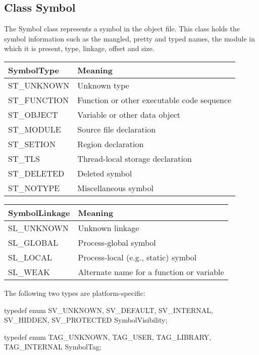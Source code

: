 \subsection{Class Symbol}

The Symbol class represents a symbol in the object file. This class holds the symbol information such as the mangled, pretty and typed names, the module in which it is present, type, linkage, offset and size.


\begin{center}
\begin{tabular}{ll}
\toprule
SymbolType & Meaning \\
\midrule
ST\_UNKNOWN & Unknown type \\
ST\_FUNCTION & Function or other executable code sequence \\
ST\_OBJECT & Variable or other data object \\
ST\_MODULE & Source file declaration \\
ST\_SETION & Region declaration \\
ST\_TLS & Thread-local storage declaration \\
ST\_DELETED & Deleted symbol \\
ST\_NOTYPE & Miscellaneous symbol \\
\bottomrule
\end{tabular}
\end{center}


\begin{center}
\begin{tabular}{ll}
\toprule
SymbolLinkage & Meaning \\
\midrule
SL\_UNKNOWN & Unknown linkage \\
SL\_GLOBAL & Process-global symbol \\
SL\_LOCAL & Process-local (e.g., static) symbol \\
SL\_WEAK & Alternate name for a function or variable \\
\bottomrule
\end{tabular}
\end{center}

The following two types are platform-specific:

\begin{apient}
typedef enum {
    SV_UNKNOWN,
    SV_DEFAULT,
    SV_INTERNAL,
    SV_HIDDEN,
    SV_PROTECTED
} SymbolVisibility;
\end{apient}

\begin{apient}
typedef enum {
    TAG_UNKNOWN,
    TAG_USER,
    TAG_LIBRARY,
    TAG_INTERNAL
} SymbolTag; 
\end{apient}

